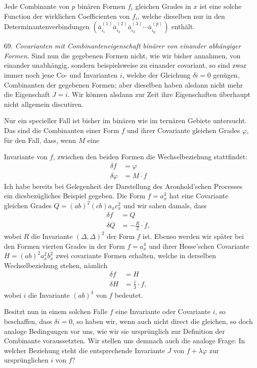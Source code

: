 \documentclass[11pt]{article}
\providecommand{\weberpage}[1]{}
\providecommand{\weq}[2]{\begin{equation}\tag{#1}#2\end{equation}}
\begin{document}
\glqq Jede Combinante von $p$ binären Formen $f_i$ gleichen Grades in $x$ ist eine solche Function der wirklichen Coefficienten von $f_i$, welche dieselben nur in den Determinantenverbindungen $(\overline a_{i_1}^{(1)}\overline a_{i_2}^{(2)}\overline a_{i_3}^{(3)}\cdots\overline a_{i_p}^{(p)})$ enthält.\grqq{}

69. \textit{Covarianten mit Combinanteneigenschaft binärer von einander abhängiger Formen.} Sind nun die gegebenen Formen nicht, wie wir bisher annahmen, von einander unabhängig, sondern beispielsweise zu einander covariant, so sind zwar immer noch jene Co- und Invarianten $i$, welche der Gleichung $\delta i=0$ genügen, Combinanten der gegebenen Formen; aber dieselben haben alsdann nicht mehr die Eigenschaft $J=i$. Wir können alsdann zur Zeit ihre Eigenschaften überhaupt nicht allgemein discutiren.

Nur ein specieller Fall ist bisher im binären wie im ternären Gebiete untersucht. Das sind die Combinanten einer Form $f$ und ihrer Covariante gleichen Grades $\varphi$, für den Fall, dass, wenn $M$ eine


\weberpage{74}
Invariante von $f$, zwischen den beiden Formen die Wechselbeziehung stattfindet:
\weq{I}{\begin{aligned} \delta f &= \varphi \\ \delta \varphi &= M\cdot f \end{aligned}}
Ich habe bereits bei Gelegenheit der Darstellung des Aronhold'schen Processes ein diesbezügliches Beispiel gegeben. Die Form $f=a_x^3$ hat eine Covariante gleichen Grades $Q=(ab)^2(cb)a_x c_x^2$ und wir sahen damals, dass
\[
\begin{aligned}
\delta f &= Q\\
\delta Q &= -\frac{R}{2}\cdot f,
\end{aligned}
\]
wobei $R$ die Invariante $(\varDelta,\varDelta)^2$ der Form $f$ ist. Ebenso werden wir später bei den Formen vierten Grades in der Form $f=a_x^4$ und ihrer Hesse'schen Covariante $H=(ab)^2a_x^2b_x^2$ zwei covariante Formen erhalten, welche in derselben Wechselbeziehung stehen, nämlich
\[
\begin{aligned}
\delta f &= H\\
\delta H &= \frac{i}{3}\cdot f,
\end{aligned}
\]
wobei $i$ die Invariante $(ab)^4$ von $f$ bedeutet.

Besitzt nun in einem solchen Falle $f$ eine Invariante oder Covariante $i$, so beschaffen, dass $\delta i=0$, so haben wir, wenn auch nicht direct die gleichen, so doch analoge Bedingungen vor uns, wie wir sie ursprünglich zur Definition der Combinante voraussetzten. Wir stellen uns demnach auch die analoge Frage: In welcher Beziehung steht die entsprechende Invariante $J$ von $f+\lambda\varphi$ zur ursprünglichen $i$ von $f$?
\end{document}
